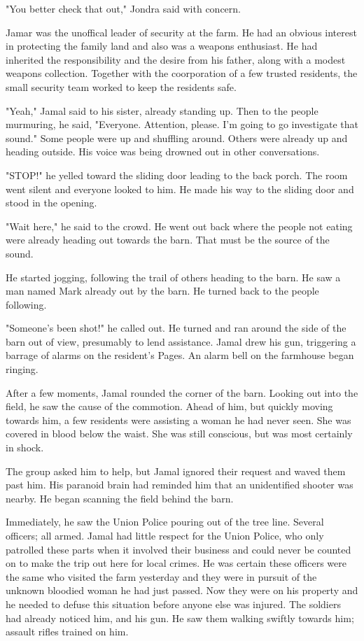 \documentclass[courier]{sffms}
\begin{document}
"You better check that out," Jondra said with concern.

Jamar was the unoffical leader of security at
the farm. He had an obvious interest in protecting
the family land and also was a weapons enthusiast.
He had inherited the responsibility and the desire
from his father, along with a modest weapons
collection. Together with the coorporation of
a few trusted residents,
the small security team worked to keep the
residents safe.

"Yeah," Jamal said to his sister, already standing up.
Then to the people murmuring, he said, "Everyone.
Attention, please. I'm going to go investigate that
sound." Some people were up and shuffling
around. Others were already up and heading
outside. His voice was being drowned out in other
conversations.

"STOP!" he yelled toward the sliding door leading
to the back porch. The room went silent and everyone
looked to him. He made his way to the sliding
door and stood in the opening.

"Wait here," he said to the crowd. He went out back
where the people not eating were already heading
out towards the barn. That must be the source of the
sound.

He started jogging, following the trail of 
others heading to the
barn. He saw a man named Mark already out by the
barn. He turned back to the people following.

"Someone's been shot!" he called out. He turned 
and ran around the side of the barn out of view,
presumably to lend assistance. Jamal drew his gun,
triggering a barrage of alarms on the resident's
Pages. An alarm bell on the farmhouse began
ringing.

After a few moments, Jamal rounded the corner 
of the barn. Looking out into the field, he saw the
cause of the commotion. Ahead of him, but quickly
moving towards him, a few residents were assisting
a woman he had never seen. She was covered in
blood below the waist. She was still conscious,
but was most certainly in shock.

The group asked him to help, but Jamal ignored
their request and waved them past him. His
paranoid brain had reminded him that an
unidentified shooter was nearby. He began scanning
the field behind the barn.

Immediately, he saw the Union Police pouring out of
the tree line. Several officers; all armed. Jamal had
little respect for the Union Police, who only patrolled
these parts when it involved their business and
could never be counted on to make the trip out here
for local crimes. He was certain these officers
were the same who visited the farm yesterday and
they were in pursuit of the unknown bloodied woman
he had just passed. Now they were on his
property and he needed to defuse this situation
before anyone else was injured. The soldiers had
already noticed him, and his gun. He saw them
walking swiftly towards him; assault rifles trained
on him.
\end{document}
